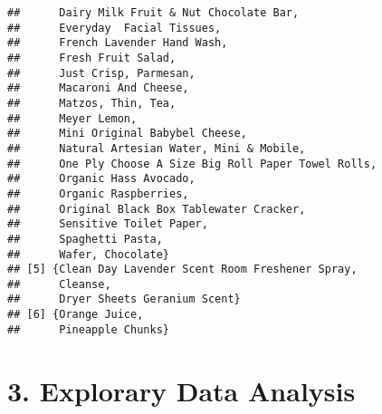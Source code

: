 \documentclass[]{article}
\newenvironment{Shaded}{\begin{snugshade}}{\end{snugshade}}
\newcommand{\CommentTok}[1]{\textcolor[rgb]{0.56,0.35,0.01}{\textit{#1}}}
\newcommand{\DataTypeTok}[1]{\textcolor[rgb]{0.13,0.29,0.53}{#1}}
\newcommand{\DecValTok}[1]{\textcolor[rgb]{0.00,0.00,0.81}{#1}}
\newcommand{\FloatTok}[1]{\textcolor[rgb]{0.00,0.00,0.81}{#1}}
\newcommand{\KeywordTok}[1]{\textcolor[rgb]{0.13,0.29,0.53}{\textbf{#1}}}
\newcommand{\NormalTok}[1]{#1}
\newcommand{\OperatorTok}[1]{\textcolor[rgb]{0.81,0.36,0.00}{\textbf{#1}}}
\newcommand{\StringTok}[1]{\textcolor[rgb]{0.31,0.60,0.02}{#1}}
\begin{document}
\begin{verbatim}
##      Dairy Milk Fruit & Nut Chocolate Bar,                   
##      Everyday  Facial Tissues,                               
##      French Lavender Hand Wash,                              
##      Fresh Fruit Salad,                                      
##      Just Crisp, Parmesan,                                   
##      Macaroni And Cheese,                                    
##      Matzos, Thin, Tea,                                      
##      Meyer Lemon,                                            
##      Mini Original Babybel Cheese,                           
##      Natural Artesian Water, Mini & Mobile,                  
##      One Ply Choose A Size Big Roll Paper Towel Rolls,       
##      Organic Hass Avocado,                                   
##      Organic Raspberries,                                    
##      Original Black Box Tablewater Cracker,                  
##      Sensitive Toilet Paper,                                 
##      Spaghetti Pasta,                                        
##      Wafer, Chocolate}                                       
## [5] {Clean Day Lavender Scent Room Freshener Spray,          
##      Cleanse,                                                
##      Dryer Sheets Geranium Scent}                            
## [6] {Orange Juice,                                           
##      Pineapple Chunks}
\end{verbatim}

\hypertarget{explorary-data-analysis}{%
\section{3. Explorary Data Analysis}\label{explorary-data-analysis}}

\begin{Shaded}
\end{Shaded}
\end{document}
